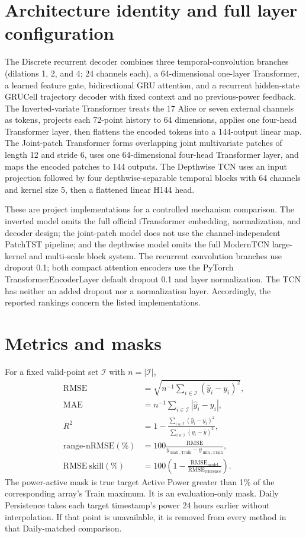 \section{Architecture identity and full layer configuration}
The Discrete recurrent decoder combines three temporal-convolution branches (dilations 1, 2, and 4; 24 channels each), a 64-dimensional one-layer Transformer, a learned feature gate, bidirectional GRU attention, and a recurrent hidden-state GRUCell trajectory decoder with fixed context and no previous-power feedback. The Inverted-variate Transformer treats the 17 Alice or seven external channels as tokens, projects each 72-point history to 64 dimensions, applies one four-head Transformer layer, then flattens the encoded tokens into a 144-output linear map. The Joint-patch Transformer forms overlapping joint multivariate patches of length 12 and stride 6, uses one 64-dimensional four-head Transformer layer, and maps the encoded patches to 144 outputs. The Depthwise TCN uses an input projection followed by four depthwise-separable temporal blocks with 64 channels and kernel size 5, then a flattened linear H144 head.

These are project implementations for a controlled mechanism comparison. The inverted model omits the full official iTransformer embedding, normalization, and decoder design; the joint-patch model does not use the channel-independent PatchTST pipeline; and the depthwise model omits the full ModernTCN large-kernel and multi-scale block system. The recurrent convolution branches use dropout 0.1; both compact attention encoders use the PyTorch TransformerEncoderLayer default dropout 0.1 and layer normalization. The TCN has neither an added dropout nor a normalization layer. Accordingly, the reported rankings concern the listed implementations.

\section{Metrics and masks}
For a fixed valid-point set $\mathcal{I}$ with $n=|\mathcal{I}|$,
\begin{align}
\mathrm{RMSE}&=\sqrt{n^{-1}\sum_{i\in\mathcal{I}}(\hat y_i-y_i)^2},\\
\mathrm{MAE}&=n^{-1}\sum_{i\in\mathcal{I}}|\hat y_i-y_i|,\\
R^2&=1-\frac{\sum_{i\in\mathcal{I}}(\hat y_i-y_i)^2}{\sum_{i\in\mathcal{I}}(y_i-\bar y)^2},\\
\mathrm{range\mbox{-}nRMSE}(\%)&=100\frac{\mathrm{RMSE}}{y_{\max,\mathrm{Train}}-y_{\min,\mathrm{Train}}},\\
\mathrm{RMSE\ skill}(\%)&=100\left(1-\frac{\mathrm{RMSE}_{\mathrm{model}}}{\mathrm{RMSE}_{\mathrm{reference}}}\right).
\end{align}
The power-active mask is true target Active Power greater than 1\% of the corresponding array's Train maximum. It is an evaluation-only mask. Daily Persistence takes each target timestamp's power 24 hours earlier without interpolation. If that point is unavailable, it is removed from every method in that Daily-matched comparison.


